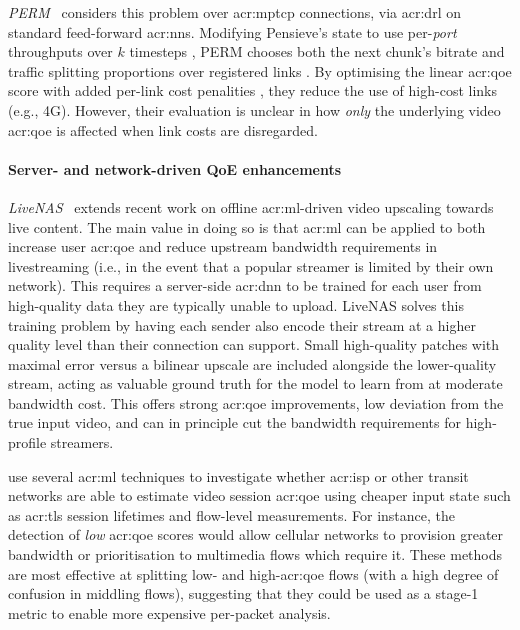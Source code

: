\emph{PERM}~\parencite{DBLP:conf/infocom/GuanZWBXS20} considers this problem over \gls{acr:mptcp} connections, via \gls{acr:drl} on standard feed-forward \glspl{acr:nn}.
Modifying Pensieve's state to use per-\emph{port} throughputs over $k$ timesteps \prllitstate, PERM
chooses both the next chunk's bitrate and traffic splitting proportions over registered links \parenglance{$\rllitactraw\times\rllitactrealraw$}.
By optimising the linear \gls{acr:qoe} score with added per-link cost penalities \prllitreward{},
they reduce the use of high-cost links (e.g., 4G).
However, their evaluation is unclear in how \emph{only} the underlying video \gls{acr:qoe} is affected when link costs are disregarded.

\paragraph{Server- and network-driven QoE enhancements}
\emph{LiveNAS}~\parencite{DBLP:conf/sigcomm/KimJYYH20} extends recent work on offline \gls{acr:ml}-driven video upscaling towards live content.
The main value in doing so is that \gls{acr:ml} can be applied to both increase user \gls{acr:qoe} and reduce upstream bandwidth requirements in livestreaming (i.e., in the event that a popular streamer is limited by their own network).
This requires a server-side \gls{acr:dnn} to be trained for each user from high-quality data they are typically unable to upload.
LiveNAS solves this training problem by having each sender also encode their stream at a higher quality level than their connection can support.
Small high-quality patches with maximal error versus a bilinear upscale are included alongside the lower-quality stream, acting as valuable ground truth for the model to learn from at moderate bandwidth cost.
This offers strong \gls{acr:qoe} improvements, low deviation from the true input video, and can in principle cut the bandwidth requirements for high-profile streamers.

\Textcite{DBLP:conf/conext/ManglaHZA20} use several \gls{acr:ml} techniques to investigate whether \gls{acr:isp} or other transit networks are able to estimate video session \gls{acr:qoe} using cheaper input state such as \gls{acr:tls} session lifetimes and flow-level measurements.
For instance, the detection of \emph{low} \gls{acr:qoe} scores would allow cellular networks to provision greater bandwidth or prioritisation to multimedia flows which require it.
These methods are most effective at splitting low- and high-\gls{acr:qoe} flows (with a high degree of confusion in middling flows), suggesting that they could be used as a stage-1 metric to enable more expensive per-packet analysis.

